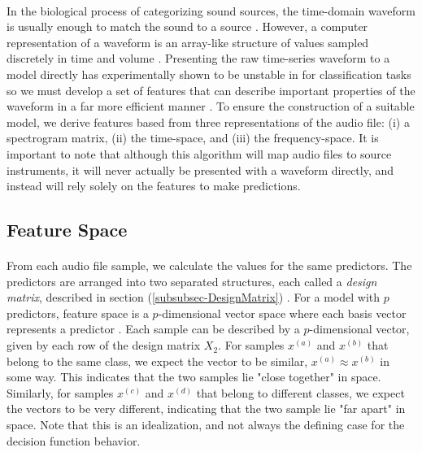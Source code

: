 \documentclass[12pt,letterpaper]{article}
\begin{document}
\paragraph*{}In the biological process of categorizing sound sources, the time-domain waveform is usually enough to match the sound to a source \cite{Olson}. However, a computer representation of a waveform is an array-like structure of values sampled discretely in time and volume \cite{Virtanen,Liu}. Presenting the raw time-series waveform to a model directly has experimentally shown to be unstable in for classification tasks so we must develop a set of features that can describe important properties of the waveform in a far more efficient manner \cite{Goodfellow,James,Serizel}. To ensure the construction of a suitable model, we derive features based from three representations of the audio file: (i) a spectrogram matrix, (ii) the time-space, and (iii) the frequency-space. It is important to note that although this algorithm will map audio files to source instruments, it will never actually be presented with a waveform directly, and instead will rely solely on the features to make predictions.


\subsection{Feature Space}

\paragraph*{}From each audio file sample, we calculate the values for the same predictors. The predictors are arranged into two separated structures, each called a \textit{design matrix}, described in section (\ref{subsubsec-DesignMatrix}) \cite{Goodfellow,Geron}. For a model with $p$ predictors, feature space is a $p$-dimensional vector space where each basis vector represents a predictor \cite{Goodfellow,James}. Each sample can be described by a $p$-dimensional vector, given by each row of the design matrix $X_2$. For samples $x^{(a)}$ and $x^{(b)}$ that belong to the same class, we expect the vector to be similar, $x^{(a)} \approx x^{(b)}$ in some way. This indicates that the two samples lie "close together" in space. Similarly, for samples $x^{(c)}$ and $x^{(d)}$ that belong to different classes, we expect the vectors to be very different, indicating that the two sample lie "far apart" in space. Note that this is an idealization, and not always the defining case for the decision function behavior.
\end{document}
